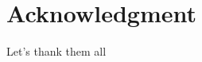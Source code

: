 \documentclass[english,11pt]{article}
\newcommand{\1}{\mathbf{1}}
\newcommand{\II}{\mathcal{I}}
\newcommand{\mk}{\mathfrak}
\numberwithin{equation}{section}
\theoremstyle{plain}
\theoremstyle{definition}
\theoremstyle{remark}
\theoremstyle{plain}
\theoremstyle{remark}
\theoremstyle{plain}
\theoremstyle{plain}
\newcommand{\be}{\begin{equation}}
\newcommand{\ee}{\end{equation}}
\begin{document}
%

\section*{Acknowledgment}
Let's thank them all






\appendix
\end{document}
